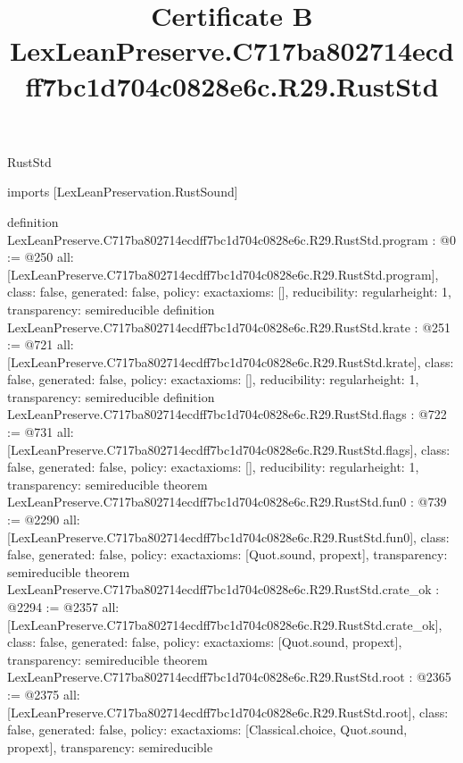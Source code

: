 \begin{lexlean}{RustStd}
\title{Certificate B LexLeanPreserve.C717ba802714ecdff7bc1d704c0828e6c.R29.RustStd}
\begin{coremodule}
imports [LexLeanPreservation.RustSound]

definition LexLeanPreserve.C717ba802714ecdff7bc1d704c0828e6c.R29.RustStd.program : @0 := @250 {
  all: [LexLeanPreserve.C717ba802714ecdff7bc1d704c0828e6c.R29.RustStd.program],
  class: false,
  generated: false,
  policy: exact{axioms: []},
  reducibility: regular{height: 1},
  transparency: semireducible
}
definition LexLeanPreserve.C717ba802714ecdff7bc1d704c0828e6c.R29.RustStd.krate : @251 := @721 {
  all: [LexLeanPreserve.C717ba802714ecdff7bc1d704c0828e6c.R29.RustStd.krate],
  class: false,
  generated: false,
  policy: exact{axioms: []},
  reducibility: regular{height: 1},
  transparency: semireducible
}
definition LexLeanPreserve.C717ba802714ecdff7bc1d704c0828e6c.R29.RustStd.flags : @722 := @731 {
  all: [LexLeanPreserve.C717ba802714ecdff7bc1d704c0828e6c.R29.RustStd.flags],
  class: false,
  generated: false,
  policy: exact{axioms: []},
  reducibility: regular{height: 1},
  transparency: semireducible
}
theorem LexLeanPreserve.C717ba802714ecdff7bc1d704c0828e6c.R29.RustStd.fun0 : @739 := @2290 {
  all: [LexLeanPreserve.C717ba802714ecdff7bc1d704c0828e6c.R29.RustStd.fun0],
  class: false,
  generated: false,
  policy: exact{axioms: [Quot.sound, propext]},
  transparency: semireducible
}
theorem LexLeanPreserve.C717ba802714ecdff7bc1d704c0828e6c.R29.RustStd.crate_ok : @2294 := @2357 {
  all: [LexLeanPreserve.C717ba802714ecdff7bc1d704c0828e6c.R29.RustStd.crate_ok],
  class: false,
  generated: false,
  policy: exact{axioms: [Quot.sound, propext]},
  transparency: semireducible
}
theorem LexLeanPreserve.C717ba802714ecdff7bc1d704c0828e6c.R29.RustStd.root : @2365 := @2375 {
  all: [LexLeanPreserve.C717ba802714ecdff7bc1d704c0828e6c.R29.RustStd.root],
  class: false,
  generated: false,
  policy: exact{axioms: [Classical.choice, Quot.sound, propext]},
  transparency: semireducible
}


\end{coremodule}
\end{lexlean}
